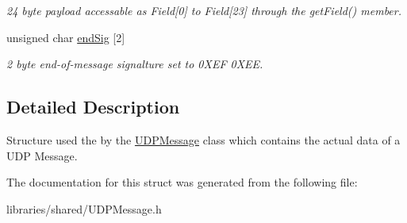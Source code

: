 \begin{DoxyCompactItemize}
\begin{DoxyCompactList}\small\item\em 24 byte payload accessable as Field\mbox{[}0\mbox{]} to Field\mbox{[}23\mbox{]} through the get\+Field() member. \end{DoxyCompactList}\item 
\mbox{\label{struct_u_d_p_message_struct_a68c8ce1a9f79ecb4b3955eaf98a4781c}} 
unsigned char \hyperlink{struct_u_d_p_message_struct_a68c8ce1a9f79ecb4b3955eaf98a4781c}{end\+Sig} \mbox{[}2\mbox{]}
\begin{DoxyCompactList}\small\item\em 2 byte end-\/of-\/message signalture set to 0\+X\+EF 0\+X\+EE. \end{DoxyCompactList}\end{DoxyCompactItemize}


\subsection{Detailed Description}
Structure used the by the \hyperlink{class_u_d_p_message}{U\+D\+P\+Message} class which contains the actual data of a U\+DP Message. 

The documentation for this struct was generated from the following file\+:\begin{DoxyCompactItemize}
\item 
libraries/shared/U\+D\+P\+Message.\+h\end{DoxyCompactItemize}
